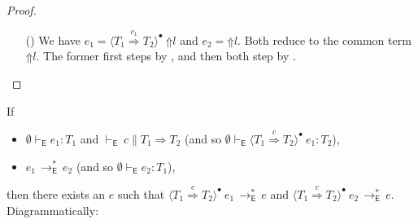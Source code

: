 \documentclass[9pt]{extarticle}
\newcommand{\ottnt}[1]{\mathit{#1}}
\newcommand{\ottsym}[1]{#1}
\begin{document}
\begin{lemma}
\begin{proof}
{\begin{itemize}
    \item[(\E{CoerceRaise})] We have $\ottnt{e_{{\mathrm{1}}}}  \ottsym{=}   \langle  \ottnt{T_{{\mathrm{1}}}}  \mathord{ \overset{ \ottnt{c_{{\mathrm{1}}}} }{\Rightarrow} }  \ottnt{T_{{\mathrm{2}}}}  \rangle^{\bullet} ~   \mathord{\Uparrow}  \ottnt{l}  $
      and $\ottnt{e_{{\mathrm{2}}}}  \ottsym{=}   \mathord{\Uparrow}  \ottnt{l} $. Both reduce to the common term
      $ \mathord{\Uparrow}  \ottnt{l} $. The former first steps by \ECastMerge, and
      then both step by .
    \end{itemize}
    \fi}
  \end{proof}
\end{lemma}

{\iffull
\begin{lemma}
  \label{lem:eideticcastcongruence}
  If
  \begin{itemize}
  \item $ \emptyset   \vdash _{  \mathsf{E}  }  \ottnt{e_{{\mathrm{1}}}}  :  \ottnt{T_{{\mathrm{1}}}} $ and $ \mathord{  \vdash _{  \mathsf{E}  } }~ \ottnt{c}   \mathrel{\parallel}   \ottnt{T_{{\mathrm{1}}}}  \Rightarrow  \ottnt{T_{{\mathrm{2}}}} $ (and so
    $ \emptyset   \vdash _{  \mathsf{E}  }   \langle  \ottnt{T_{{\mathrm{1}}}}  \mathord{ \overset{ \ottnt{c} }{\Rightarrow} }  \ottnt{T_{{\mathrm{2}}}}  \rangle^{\bullet} ~  \ottnt{e_{{\mathrm{1}}}}   :  \ottnt{T_{{\mathrm{2}}}} $),
  \item $\ottnt{e_{{\mathrm{1}}}} \,  \longrightarrow ^{*}_{  \mathsf{E}  }  \, \ottnt{e_{{\mathrm{2}}}}$ (and so $ \emptyset   \vdash _{  \mathsf{E}  }  \ottnt{e_{{\mathrm{2}}}}  :  \ottnt{T_{{\mathrm{1}}}} $),
  \end{itemize}
then there exists an $\ottnt{e}$ such that $ \langle  \ottnt{T_{{\mathrm{1}}}}  \mathord{ \overset{ \ottnt{c} }{\Rightarrow} }  \ottnt{T_{{\mathrm{2}}}}  \rangle^{\bullet} ~  \ottnt{e_{{\mathrm{1}}}}  \,  \longrightarrow ^{*}_{  \mathsf{E}  }  \, \ottnt{e}$
  and $ \langle  \ottnt{T_{{\mathrm{1}}}}  \mathord{ \overset{ \ottnt{c} }{\Rightarrow} }  \ottnt{T_{{\mathrm{2}}}}  \rangle^{\bullet} ~  \ottnt{e_{{\mathrm{2}}}}  \,  \longrightarrow ^{*}_{  \mathsf{E}  }  \, \ottnt{e}$. Diagrammatically:
\begin{center}
\end{center}
\end{lemma}}
\end{document}
